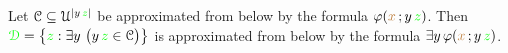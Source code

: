 \documentclass[creche.tex]{subfiles}
\begin{document}
% 
% 
% 
% 
% 
% 
% 
% 
% 

\begin{proposition}\label{prop_sh_exp_qe}
Let $\EuScript C\subseteq\EuScript U^{|y\,{\color{green} z}|}$ be approximated from below by the formula $\varphi({\color{brown} x}\,;y\,{\color{green} z})$.
Then ${\color{green}\EuScript D}=\big\{{\color{green} z}:\exists y\ \big(y\,{\color{green} z}\in\EuScript C\big)\big\}$ is approximated from below by the formula $\exists y\,\varphi({\color{brown} x}\,;y\,{\color{green} z})$.
\end{proposition}
\end{document}

